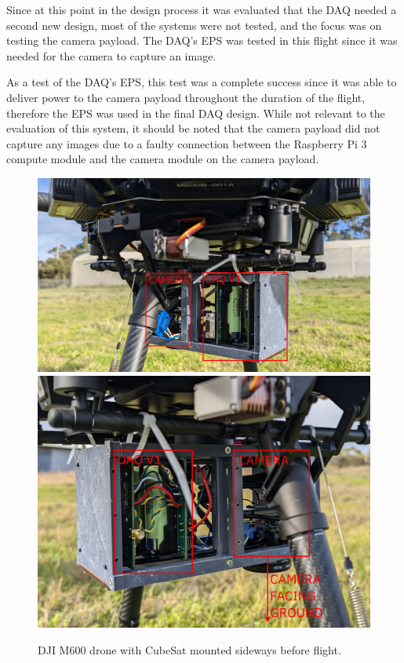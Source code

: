 \documentclass[]{report}
\begin{document}
Since at this point in the design process it was evaluated that the DAQ needed a second new design, most of the systems were not tested, and the focus was on testing the camera payload. The DAQ's EPS was tested in this flight since it was needed for the camera to capture an image.

As a test of the DAQ's EPS, this test was a complete success since it was able to deliver power to the camera payload throughout the duration of the flight, therefore the EPS was used in the final DAQ design. While not relevant to the evaluation of this system, it should be noted that the camera payload did not capture any images due to a faulty connection between the Raspberry Pi 3 compute module and the camera module on the camera payload.

\begin{figure}[H]
  \centering
  \includegraphics[width=0.9\linewidth]{images/1st_flight_drone_cube.jpg}
  \includegraphics[width=0.9\linewidth]{images/1st_flight_drone_cube_2.jpg}
  \caption{DJI M600 drone with CubeSat mounted sideways before flight.}
  \label{fig:drone-cube-1}
\end{figure}
\end{document}
